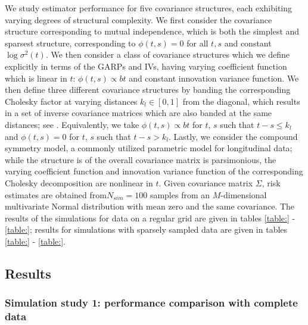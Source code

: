 \documentclass[12pt]{article}
\theoremstyle{definition}
\begin{document}
We study estimator performance for five covariance structures, each exhibiting varying degrees of structural complexity. We first consider the covariance structure corresponding to mutual independence, which is both the simplest and sparsest structure, corresponding to $\phi\left(t, s\right) = 0$ for all $t, s$ and constant $\log \sigma^2\left(t\right)$. We then consider a class of covariance structures which we define explicitly in terms of the GARPs and IVs, having varying coefficient function which is linear in $t$: $\phi\left(t,s\right) \propto bt$ and constant innovation variance function.  We then define three different covariance structures by banding the corresponding Cholesky factor at varying distances $k_l \in \left[0,1\right]$ from the diagonal, which results in a set of inverse covariance matrices which are also banded at the same distances; see \citet{bickel2008regularized}. Equivalently,  we take $\phi\left(t,s\right) \propto bt$ for $t$, $s$ such that $t - s \le k_l$ and $\phi\left(t,s\right) = 0$ for $t$, $s$ such that $t - s > k_l$.  Lastly, we consider the compound symmetry model, a commonly utilized parametric model for longitudinal data; while the structure is of the overall covariance matrix is parsimonious, the varying coefficient function and innovation variance function of the corresponding Cholesky decomposition are nonlinear in $t$.  Given covariance matrix $\Sigma$, risk estimates are obtained from$N_{sim} = 100$ samples from an $M$-dimensional multivariate Normal distribution with mean zero and the same covariance. The results of the simulations for data on a regular grid are given in tables \ref{table:} - \ref{table:}; results for simulations with sparsely sampled data are given in tables \ref{table:} - \ref{table:}. 

\subsection{Results}
\subsubsection{Simulation study 1: performance comparison with complete data}

\setlength{\dashlinedash}{0.5pt}
\setlength{\dashlinegap}{1pt}
\setlength{\arrayrulewidth}{0.2pt}
\end{document}
